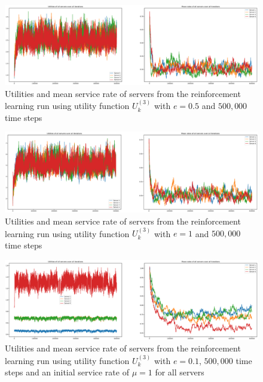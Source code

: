 \begin{figure}[H]
    \includegraphics[width=\textwidth]{chapters/00_appendix/03_more_rl_results/Bin/utility_3_eps/u3_2_e05.eps}
    \caption{Utilities and mean service rate of servers from the reinforcement
    learning run using utility function \(U_k^{(3)}\) with \(e = 0.5\) and
    \(500,\!000\) time steps}
    \label{fig:RL_utility3_2_e05}
\end{figure}

\begin{figure}[H]
    \includegraphics[width=\textwidth]{chapters/00_appendix/03_more_rl_results/Bin/utility_3_eps/u3_2_e1.eps}
    \caption{Utilities and mean service rate of servers from the reinforcement
    learning run using utility function \(U_k^{(3)}\) with \(e = 1\) and
    \(500,\!000\) time steps}
    \label{fig:RL_utility3_2_e1}
\end{figure}

\begin{figure}[H]
    \includegraphics[width=\textwidth]{chapters/00_appendix/03_more_rl_results/Bin/utility_3_eps/u3_3_initial_1.eps}
    \caption{Utilities and mean service rate of servers from the reinforcement
    learning run using utility function \(U_k^{(3)}\) with \(e = 0.1\),
    \(500,\!000\) time steps and an initial service rate of \(\mu = 1\) for all
    servers}
    \label{fig:RL_utility3_3_initial_1}
\end{figure}

